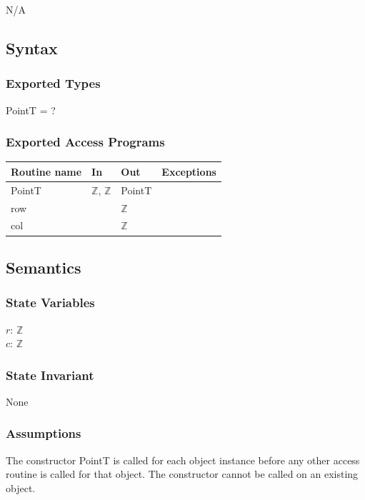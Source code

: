 \documentclass[12pt]{article}
\begin{document}
N/A

\subsection* {Syntax}

\subsubsection* {Exported Types}

PointT = ?

\subsubsection* {Exported Access Programs}

\begin{tabular}{| l | l | l | l |}
\hline
\textbf{Routine name} & \textbf{In} & \textbf{Out} & \textbf{Exceptions}\\
\hline
PointT & $\mathbb{Z}$, $\mathbb{Z}$ & PointT & \\
\hline
row & ~ & $\mathbb{Z}$ & ~\\
\hline
col & ~ & $\mathbb{Z}$ & ~\\
\hline
\end{tabular}

\subsection* {Semantics}

\subsubsection* {State Variables}

$r$: $\mathbb{Z}$\\
$c$: $\mathbb{Z}$

\subsubsection* {State Invariant}

None

\subsubsection* {Assumptions}

The constructor PointT is called for each object instance before any other
access routine is called for that object.  The constructor cannot be called on
an existing object.
\end{document}

